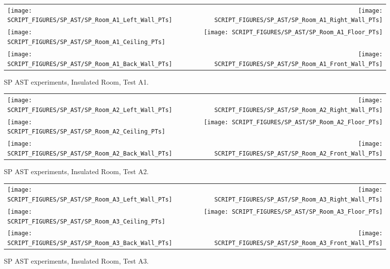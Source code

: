 \newpage

\begin{figure}[p]
\begin{tabular*}{\textwidth}{l@{\extracolsep{\fill}}r}
\texttt{[image: SCRIPT\_FIGURES/SP\_AST/SP\_Room\_A1\_Left\_Wall\_PTs]} &  \texttt{[image: SCRIPT\_FIGURES/SP\_AST/SP\_Room\_A1\_Right\_Wall\_PTs]}  \\
\texttt{[image: SCRIPT\_FIGURES/SP\_AST/SP\_Room\_A1\_Ceiling\_PTs]}   &  \texttt{[image: SCRIPT\_FIGURES/SP\_AST/SP\_Room\_A1\_Floor\_PTs]}  \\
\texttt{[image: SCRIPT\_FIGURES/SP\_AST/SP\_Room\_A1\_Back\_Wall\_PTs]} &  \texttt{[image: SCRIPT\_FIGURES/SP\_AST/SP\_Room\_A1\_Front\_Wall\_PTs]}
\end{tabular*}
\caption{SP AST experiments, Insulated Room, Test A1.}
\label{SP_Room_A1_PTs}
\end{figure}

\begin{figure}[p]
\begin{tabular*}{\textwidth}{l@{\extracolsep{\fill}}r}
\texttt{[image: SCRIPT\_FIGURES/SP\_AST/SP\_Room\_A2\_Left\_Wall\_PTs]} &  \texttt{[image: SCRIPT\_FIGURES/SP\_AST/SP\_Room\_A2\_Right\_Wall\_PTs]}  \\
\texttt{[image: SCRIPT\_FIGURES/SP\_AST/SP\_Room\_A2\_Ceiling\_PTs]}   &  \texttt{[image: SCRIPT\_FIGURES/SP\_AST/SP\_Room\_A2\_Floor\_PTs]}  \\
\texttt{[image: SCRIPT\_FIGURES/SP\_AST/SP\_Room\_A2\_Back\_Wall\_PTs]} &  \texttt{[image: SCRIPT\_FIGURES/SP\_AST/SP\_Room\_A2\_Front\_Wall\_PTs]}
\end{tabular*}
\caption{SP AST experiments, Insulated Room, Test A2.}
\label{SP_Room_A2_PTs}
\end{figure}

\begin{figure}[p]
\begin{tabular*}{\textwidth}{l@{\extracolsep{\fill}}r}
\texttt{[image: SCRIPT\_FIGURES/SP\_AST/SP\_Room\_A3\_Left\_Wall\_PTs]} &  \texttt{[image: SCRIPT\_FIGURES/SP\_AST/SP\_Room\_A3\_Right\_Wall\_PTs]}  \\
\texttt{[image: SCRIPT\_FIGURES/SP\_AST/SP\_Room\_A3\_Ceiling\_PTs]}   &  \texttt{[image: SCRIPT\_FIGURES/SP\_AST/SP\_Room\_A3\_Floor\_PTs]}  \\
\texttt{[image: SCRIPT\_FIGURES/SP\_AST/SP\_Room\_A3\_Back\_Wall\_PTs]} &  \texttt{[image: SCRIPT\_FIGURES/SP\_AST/SP\_Room\_A3\_Front\_Wall\_PTs]}
\end{tabular*}
\caption{SP AST experiments, Insulated Room, Test A3.}
\label{SP_Room_A3_PTs}
\end{figure}


